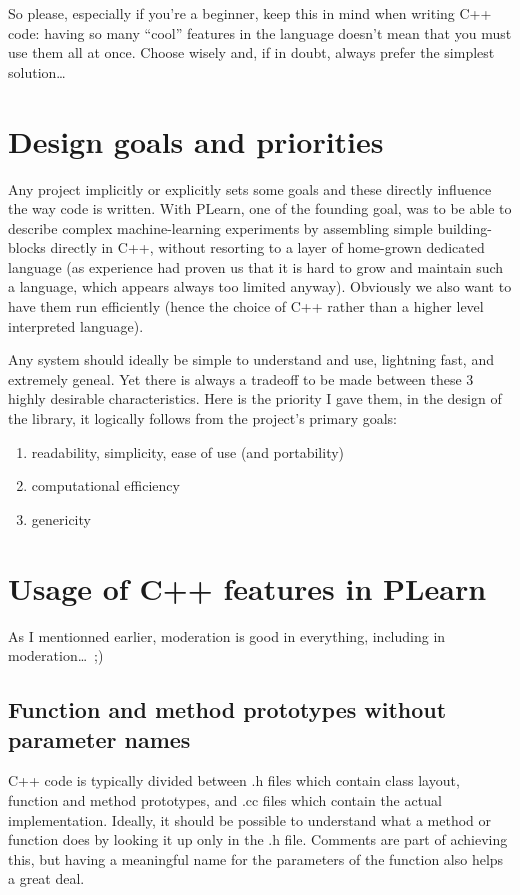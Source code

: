 \documentclass[11pt]{book}
\begin{document}
 So please, especially if you're a beginner, keep this in mind
when writing C++ code: having so many ``cool'' features in the language
doesn't mean that you must use them all at once. Choose wisely and,
if in doubt, always prefer the simplest solution\ldots

\section{Design goals and priorities}

 Any project implicitly or explicitly sets some goals and these
directly influence the way code is written. With PLearn, one of the
founding goal, was to be able to describe complex machine-learning
experiments by assembling simple building-blocks directly in C++,
without resorting to a layer of home-grown dedicated language (as
experience had proven us that it is hard to grow and maintain such
a language, which appears always too limited anyway). Obviously
we also want to have them run efficiently (hence the choice of C++
rather than a higher level interpreted language).

 Any system should ideally be simple to understand and use, lightning
fast, and extremely geneal. Yet there is always a tradeoff to be made
between these 3 highly desirable characteristics. Here is the priority
I gave them, in the design of the library, it logically follows from
the project's primary goals:

\begin{enumerate}
\item  readability, simplicity, ease of use (and portability)
\item  computational efficiency
\item  genericity
\end{enumerate}

\section{Usage of C++ features in PLearn}

 As I mentionned earlier, moderation is good in everything, including in
 moderation\ldots\ ;) 

\subsection*{Function and method prototypes without parameter names}
 C++ code is typically divided between .h files which contain class
layout, function and method prototypes, and .cc files which contain the
actual implementation. Ideally, it should be possible to understand
what a method or function does by looking it up only in the .h
file. Comments are part of achieving this, but having a meaningful
name for the parameters of the function also helps a great deal.
\end{document}
